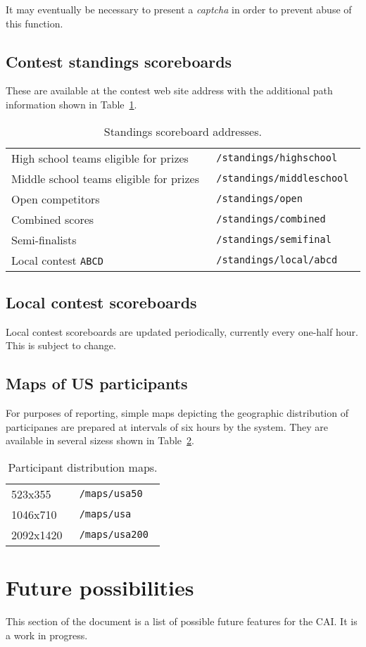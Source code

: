 \documentclass[11pt,letterpaper]{refart}
\newenvironment{fulltable}[1][tbp]
 {\begin{table}[#1]%
  \hspace*{-\leftmarginwidth}%
  \begin{minipage}{\fullwidth}}
 {\end{minipage}\end{table}}
\begin{document}
It may eventually be necessary to present a \emph{captcha} in order to
prevent abuse of this function.

\subsection{Contest standings scoreboards}
These are available at the contest web site address with the
additional path information shown in Table~\ref{tbl:scoreboards}.\
\begin{fulltable}
\centering
\caption{Standings scoreboard addresses.}
\begin{tabular}{l>{\tt}l}
High school teams eligible for prizes & /standings/highschool \\
Middle school teams eligible for prizes & /standings/middleschool \\
Open competitors & /standings/open \\
Combined scores & /standings/combined \\
Semi-finalists & /standings/semifinal \\
Local contest \texttt{ABCD} & /standings/local/abcd
\end{tabular}
\label{tbl:scoreboards}
\end{fulltable}

\subsection{Local contest scoreboards}
Local contest scoreboards are updated periodically, currently every
one-half hour.  This is subject to change.

\subsection{Maps of US participants}
For purposes of reporting, simple maps depicting the geographic
distribution of participanes are prepared at intervals of six hours by
the system.  They are available in several sizess shown in
Table~\ref{tbl:maps}.\
\begin{table}
\centering
\caption{Participant distribution maps.}
\begin{tabular}{l>{\tt}l}
523x355 & /maps/usa50  \\
1046x710 & /maps/usa \\
 2092x1420 & /maps/usa200 
\end{tabular}
\label{tbl:maps}
\end{table}

\section{Future possibilities}
This section of the document is a list of possible future features for
the CAI. It is a work in progress.
\end{document}
